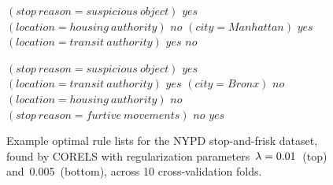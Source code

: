 \begin{figure}[b!]
\begin{algorithmic}
\State \bif $(stop~reason = suspicious~object)$ \bthen $yes$ 
\State \belif $(location = housing~authority)$ \bthen $no$
\State \belif $(city = Manhattan)$ \bthen $yes$
\State \belif $(location = transit~authority)$ \bthen $yes$
\State \belse $no$
\end{algorithmic}
\vspace{1mm}
\begin{algorithmic}
\State \bif $(stop~reason = suspicious~object)$ \bthen $yes$ 
\State \belif $(location = transit~authority)$ \bthen $yes$
\State \belif $(city = Bronx)$ \bthen $no$
\State \belif $(location = housing~authority)$ \bthen $no$
\State \belif $(stop~reason = furtive~movements)$ \bthen $no$
\State \belse $yes$
\end{algorithmic}
\caption{Example optimal rule lists for the NYPD stop-and-frisk dataset,
found by CORELS with regularization parameters~${{\lambda} = 0.01}$~(top) and~0.005~(bottom),
across 10 cross-validation folds.
}
\label{fig:cpw-rule-list}
\end{figure}

